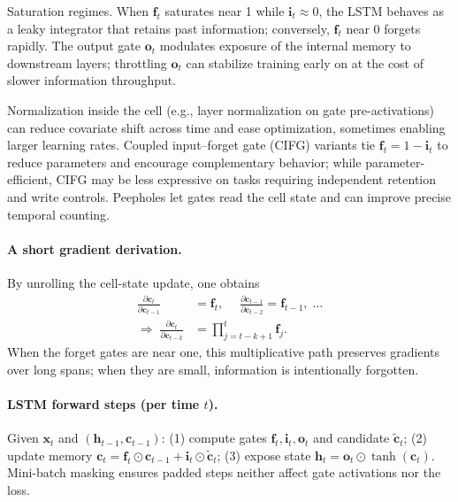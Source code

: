 Saturation regimes. When \(\mathbf{f}_t\) saturates near 1 while \(\mathbf{i}_t \approx 0\), the LSTM behaves as a leaky integrator that retains past information; conversely, \(\mathbf{f}_t\) near 0 forgets rapidly. The output gate \(\mathbf{o}_t\) modulates exposure of the internal memory to downstream layers; throttling \(\mathbf{o}_t\) can stabilize training early on at the cost of slower information throughput.
\par
Normalization inside the cell (e.g., layer normalization on gate pre-activations) can reduce covariate shift across time and ease optimization, sometimes enabling larger learning rates. Coupled input–forget gate (CIFG) variants tie \(\mathbf{f}_t = 1-\mathbf{i}_t\) to reduce parameters and encourage complementary behavior; while parameter-efficient, CIFG may be less expressive on tasks requiring independent retention and write controls. Peepholes let gates read the cell state and can improve precise temporal counting.

\paragraph{A short gradient derivation.} By unrolling the cell-state update, one obtains
\begin{align}
\frac{\partial \mathbf{c}_t}{\partial \mathbf{c}_{t-1}} &= \mathbf{f}_t,\quad\; \frac{\partial \mathbf{c}_{t-1}}{\partial \mathbf{c}_{t-2}} = \mathbf{f}_{t-1},\; \ldots \\
\Rightarrow\; \frac{\partial \mathbf{c}_t}{\partial \mathbf{c}_{t-k}} &= \prod_{j=t-k+1}^{t} \mathbf{f}_j.
\end{align}
When the forget gates are near one, this multiplicative path preserves gradients over long spans; when they are small, information is intentionally forgotten.

\paragraph{LSTM forward steps (per time \(t\)).} Given \(\mathbf{x}_t\) and \((\mathbf{h}_{t-1},\mathbf{c}_{t-1})\): (1) compute gates \(\mathbf{f}_t,\mathbf{i}_t,\mathbf{o}_t\) and candidate \(\tilde{\mathbf{c}}_t\); (2) update memory \(\mathbf{c}_t = \mathbf{f}_t\odot\mathbf{c}_{t-1}+\mathbf{i}_t\odot\tilde{\mathbf{c}}_t\); (3) expose state \(\mathbf{h}_t = \mathbf{o}_t\odot \tanh(\mathbf{c}_t)\). Mini-batch masking ensures padded steps neither affect gate activations nor the loss.

